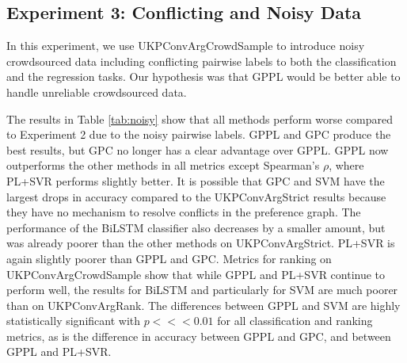 \subsection{Experiment 3: Conflicting and Noisy Data}

In this experiment, we use UKPConvArgCrowdSample to introduce noisy crowdsourced data 
including conflicting pairwise labels
to both the classification and the regression tasks.
Our hypothesis was that GPPL would be better able to handle unreliable crowdsourced data.

The results in Table \ref{tab:noisy} show that all methods perform worse compared to Experiment 2
due to the noisy pairwise labels. 
GPPL and GPC produce the best results, but GPC no longer has a clear advantage over GPPL. 
GPPL now outperforms the other methods in all metrics except Spearman's $\rho$, where PL+SVR performs slightly better. 
It is possible that GPC and SVM have the
largest drops in accuracy compared to the UKPConvArgStrict results because they 
have no mechanism to resolve conflicts in the preference graph. 
The performance of the BiLSTM classifier also 
decreases by a smaller amount, but was already poorer than the other methods on UKPConvArgStrict. 
PL+SVR is again slightly poorer than GPPL and GPC.
Metrics for ranking on UKPConvArgCrowdSample show that while GPPL and PL+SVR continue to perform well, the 
results for BiLSTM and particularly for SVM are much poorer than on UKPConvArgRank. The
differences between GPPL and SVM are highly statistically significant with $p<<<0.01$ for all classification and ranking metrics, as is the difference in accuracy between GPPL and GPC, and between GPPL and PL+SVR.

